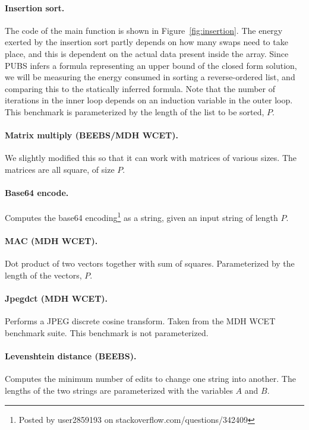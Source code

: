 \documentclass[9pt,preprint]{sigplanconf}
\newcommand{\figref}[1]{Figure~\ref{fig:#1}}
\begin{document}
\paragraph{Insertion sort.}
The code of the main function is shown in \figref{insertion}. The
energy exerted by the insertion sort partly depends on how many swaps need to take
place, and this is dependent on the actual data present inside the array. Since
PUBS infers a formula representing an upper bound of the closed form solution,
we will be measuring the energy consumed in sorting a reverse-ordered list, and
comparing this to the statically 
inferred formula. Note that the number of iterations in the inner loop depends
on an induction variable in the outer loop. This benchmark is parameterized by
the length of the list to be sorted, $P$.

\paragraph{Matrix multiply (BEEBS/MDH WCET).} We slightly
modified this so that it can work with matrices of various sizes. The matrices are all square, of size $P$.

\paragraph{Base64 encode.}
Computes the base64 encoding\footnote{Posted by user2859193 on
  stackoverflow.com/questions/342409} as a string, given an input string of length $P$.

\paragraph{MAC (MDH WCET).} Dot product of two vectors together with sum of
squares. Parameterized by the length of the vectors, $P$.

\paragraph{Jpegdct (MDH WCET).} Performs a JPEG discrete cosine transform. Taken
from the MDH WCET benchmark suite. This benchmark is not parameterized.

\paragraph{Levenshtein distance (BEEBS).} Computes the minimum number of edits to
change one string into another. The lengths of the two strings are
parameterized with the variables $A$ and $B$.
\end{document}
